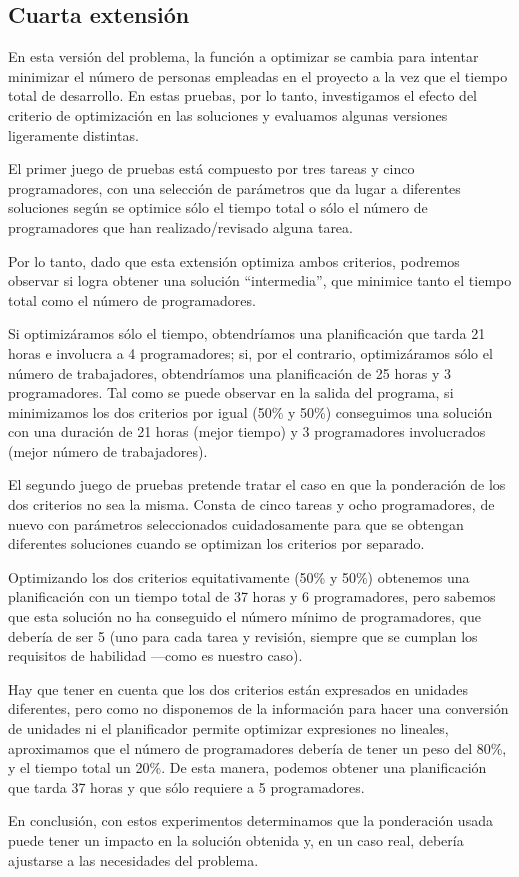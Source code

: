 
\subsection{Cuarta extensión} \label{sec:res-ext4}

En esta versión del problema, la función a optimizar se cambia para intentar 
minimizar el número de personas empleadas en el proyecto a la vez que el 
tiempo total de desarrollo. En estas pruebas, por lo tanto, investigamos el 
efecto del criterio de optimización en las soluciones y evaluamos algunas 
versiones ligeramente distintas.

El primer juego de pruebas está compuesto por tres tareas y cinco 
programadores, con una selección de parámetros que da lugar a diferentes 
soluciones según se optimice sólo el tiempo total o sólo el número de 
programadores que han realizado/revisado alguna tarea. 

Por lo tanto, dado que esta extensión optimiza ambos criterios, podremos 
observar si logra obtener una solución ``intermedia'', que minimice tanto el 
tiempo total como el número de programadores.

Si optimizáramos sólo el tiempo, obtendríamos una planificación que tarda 21 
horas e involucra a 4 programadores; si, por el contrario, optimizáramos sólo 
el número de trabajadores, obtendríamos una planificación de 25 horas y 3 
programadores. Tal como se puede observar en la salida del programa, si 
minimizamos los dos criterios por igual (50\% y 50\%) conseguimos una solución 
con una duración de 21 horas (mejor tiempo) y 3 programadores involucrados 
(mejor número de trabajadores).



El segundo juego de pruebas pretende tratar el caso en que la ponderación de 
los dos criterios no sea la misma. Consta de cinco tareas y ocho 
programadores, de nuevo con parámetros seleccionados cuidadosamente para que se
obtengan diferentes soluciones cuando se optimizan los criterios por separado.

Optimizando los dos criterios equitativamente (50\% y 50\%) obtenemos una 
planificación con un tiempo total de 37 horas y 6 programadores, pero sabemos 
que esta solución no ha conseguido el número mínimo de programadores, que 
debería de ser 5 (uno para cada tarea y revisión, siempre que se cumplan los 
requisitos de habilidad ---como es nuestro caso).

Hay que tener en cuenta que los dos criterios están expresados en unidades 
diferentes, pero como no disponemos de la información para hacer una 
conversión de unidades ni el planificador permite optimizar expresiones no
lineales, aproximamos que el número de programadores debería de tener un peso 
del 80\%, y el tiempo total un 20\%. De esta manera, podemos obtener una 
planificación que tarda 37 horas y que sólo requiere a 5 programadores.

En conclusión, con estos experimentos determinamos que la ponderación usada 
puede tener un impacto en la solución obtenida y, en un caso real, debería 
ajustarse a las necesidades del problema.


